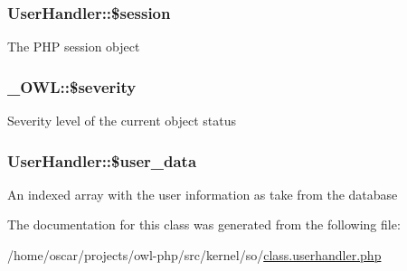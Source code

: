 \subsubsection[{\$session}]{\setlength{\rightskip}{0pt plus 5cm}UserHandler::\$session}\label{classUserHandler_af097b7fd1ee085b46a6c34e071508a7f}
The PHP session object 
\subsubsection[{\$severity}]{\setlength{\rightskip}{0pt plus 5cm}\_\-OWL::\$severity}\label{class__OWL_ad26b40a9dbbacb33e299b17826f8327c}
Severity level of the current object status 
\subsubsection[{\$user\_\-data}]{\setlength{\rightskip}{0pt plus 5cm}UserHandler::\$user\_\-data}\label{classUserHandler_ae7a2d59eee65560ac96b860e828bb445}
An indexed array with the user information as take from the database 

The documentation for this class was generated from the following file:\begin{DoxyCompactItemize}
\item 
/home/oscar/projects/owl-\/php/src/kernel/so/\hyperlink{class_8userhandler_8php}{class.userhandler.php}\end{DoxyCompactItemize}
